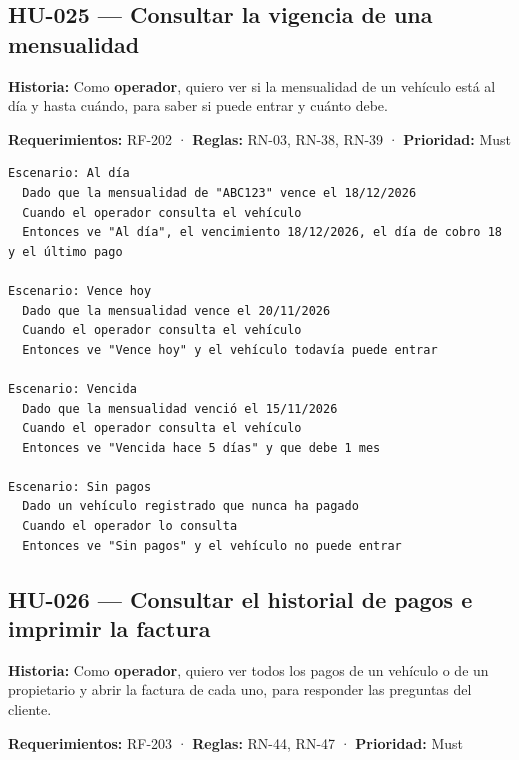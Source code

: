 \subsection{HU-025 — Consultar la vigencia de una mensualidad}

\textbf{Historia:} Como \textbf{operador}, quiero ver si la mensualidad de un vehículo está al día y hasta cuándo, para saber si puede entrar y cuánto debe.


\textbf{Requerimientos:} RF-202 · \textbf{Reglas:} RN-03, RN-38, RN-39 · \textbf{Prioridad:} Must


\begin{lstlisting}[style=gherkin]
Escenario: Al día
  Dado que la mensualidad de "ABC123" vence el 18/12/2026
  Cuando el operador consulta el vehículo
  Entonces ve "Al día", el vencimiento 18/12/2026, el día de cobro 18 y el último pago

Escenario: Vence hoy
  Dado que la mensualidad vence el 20/11/2026
  Cuando el operador consulta el vehículo
  Entonces ve "Vence hoy" y el vehículo todavía puede entrar

Escenario: Vencida
  Dado que la mensualidad venció el 15/11/2026
  Cuando el operador consulta el vehículo
  Entonces ve "Vencida hace 5 días" y que debe 1 mes

Escenario: Sin pagos
  Dado un vehículo registrado que nunca ha pagado
  Cuando el operador lo consulta
  Entonces ve "Sin pagos" y el vehículo no puede entrar
\end{lstlisting}



\subsection{HU-026 — Consultar el historial de pagos e imprimir la factura}

\textbf{Historia:} Como \textbf{operador}, quiero ver todos los pagos de un vehículo o de un propietario y abrir la factura de cada uno, para responder las preguntas del cliente.


\textbf{Requerimientos:} RF-203 · \textbf{Reglas:} RN-44, RN-47 · \textbf{Prioridad:} Must



